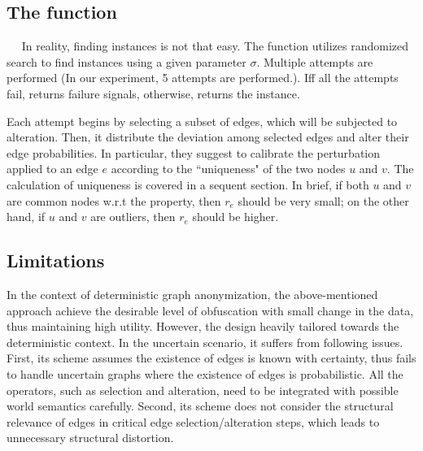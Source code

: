 \subsection{The function {\genobf}}~~
In reality, finding {\keobf} instances is not that easy. The function {\genobf} utilizes randomized search to find {\keobf} instances using a given parameter $\sigma$. Multiple  attempts are performed (In our experiment, 5 attempts are performed.). Iff all the attempts fail, {\genobf} returns failure signals, otherwise, returns the {\keobf} instance. 

Each attempt begins by selecting a subset of edges, which will be subjected to alteration. Then, it distribute the deviation among selected edges and alter their edge probabilities. In particular, they suggest to calibrate the perturbation applied to an edge $e$ according to the ``uniqueness" of the two nodes $u$ and $v$. The calculation of uniqueness is covered in a sequent section. In brief, if both $u$ and $v$ are common nodes w.r.t the property, then $r_{e}$ should be very small; on the other hand, if $u$ and $v$ are outliers, then $r_{e}$ should be higher. 

\subsection{Limitations} 
In the context of deterministic graph anonymization, the above-mentioned approach achieve the desirable level of obfuscation with small change in the data, thus maintaining high utility. 
However, the design heavily tailored towards the deterministic context. In the uncertain scenario, it suffers from following issues. First, its scheme assumes the existence of edges is known with certainty, thus fails to handle uncertain graphs where the existence of edges is probabilistic. All the operators, such as selection and alteration, need to be integrated with possible world semantics carefully.  
Second, its scheme does not consider the structural relevance of edges in critical edge selection/alteration steps, which leads to unnecessary structural distortion.




